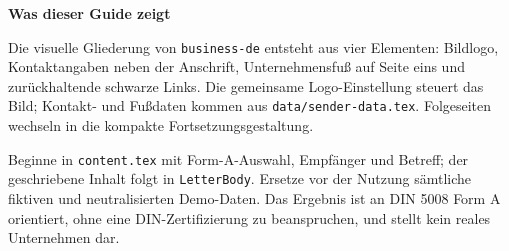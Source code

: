 


\begin{LetterBody}

\textbf{Was dieser Guide zeigt}

Die visuelle Gliederung von \texttt{business-de} entsteht aus vier Elementen: Bildlogo, Kontaktangaben neben der Anschrift, Unternehmensfuß auf Seite eins und zurückhaltende schwarze Links. Die gemeinsame Logo-Einstellung steuert das Bild; Kontakt- und Fußdaten kommen aus \texttt{data/sender-data.tex}. Folgeseiten wechseln in die kompakte Fortsetzungsgestaltung.

Beginne in \texttt{content.tex} mit Form-A-Auswahl, Empfänger und Betreff; der geschriebene Inhalt folgt in \texttt{LetterBody}. Ersetze vor der Nutzung sämtliche fiktiven und neutralisierten Demo-Daten. Das Ergebnis ist an DIN 5008 Form A orientiert, ohne eine DIN-Zertifizierung zu beanspruchen, und stellt kein reales Unternehmen dar.

\end{LetterBody}
